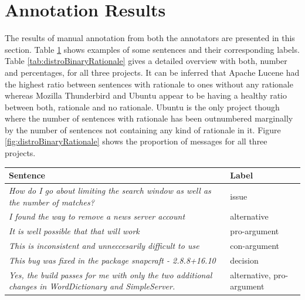 \documentclass[a4paper,12pt,twoside]{report}
\begin{document}
\section{Annotation Results}
The results of manual annotation from both the annotators are presented in this section. Table \ref{tab:rationaleExample} shows examples of some sentences and their corresponding labels. Table \ref{tab:distroBinaryRationale} gives a detailed overview with both, number and percentages, for all three projects. It can be inferred that Apache Lucene had the highest ratio between sentences with rationale to ones without any rationale whereas Mozilla Thunderbird and Ubuntu appear to be having a healthy ratio between both, rationale and no rationale. Ubuntu is the only project though where the number of sentences with rationale has been outnumbered marginally by the number of sentences not containing any kind of rationale in it. Figure \ref{fig:distroBinaryRationale} shows the proportion of messages for all three projects. 
\begin{table} %
    \centering
    \begin{adjustbox}{max width=\columnwidth}
    \def\arraystretch{1} %
    \begin{tabular}{p{10cm} p{5cm}}
        \toprule
        \textbf{Sentence} & \textbf{Label}\\
        \midrule
			\textit{How do I go about limiting the search window as well as the number of matches?} & issue\\
			\textit{I found the way to remove a news server account} & alternative \\ 
			\textit{It is well possible that that will work} & pro-argument \\ 
			\textit{This is inconsistent and unneccesarily difficult to use} & con-argument \\ 
			\textit{This bug was fixed in the package snapcraft - 2.8.8+16.10} & decision \\ 
			\textit{Yes, the build passes for me with only the two additional changes in WordDictionary and SimpleServer.} & alternative, pro-argument \\
        \midrule
    \end{tabular}
    \end{adjustbox}
    \label{tab:rationaleExample}
\end{table}
\newline \newline
\end{document}
